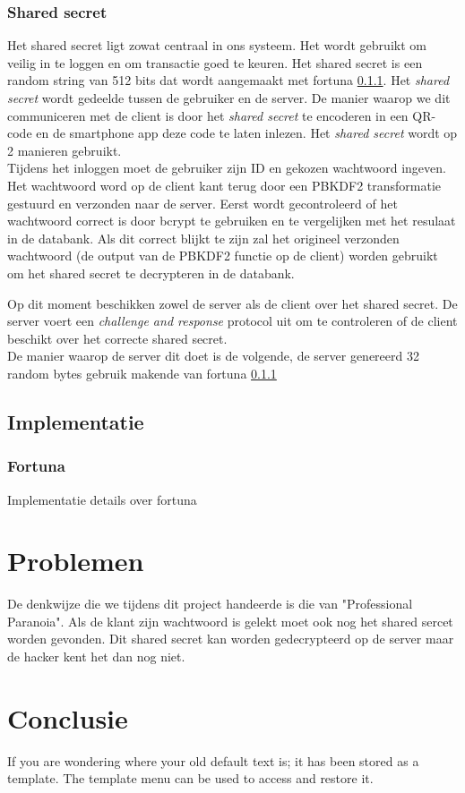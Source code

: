 \documentclass[11pt]{article}
\begin{document}
\subsubsection{Shared secret}
Het shared secret ligt zowat centraal in ons systeem. Het wordt gebruikt om veilig in te loggen en om transactie goed te keuren. Het shared secret is een random string van 512 bits dat wordt aangemaakt met fortuna \ref{sec:fortuna}. 
Het \emph{shared secret} wordt gedeelde tussen de gebruiker en de server. De manier waarop we dit communiceren met de client is door het \emph{shared secret} te encoderen in een QR-code en de smartphone app deze code te laten inlezen. %
Het \emph{shared secret} wordt op 2 manieren gebruikt. \\
Tijdens het inloggen moet de gebruiker zijn ID en gekozen wachtwoord ingeven. Het wachtwoord word op de client kant terug door een PBKDF2 transformatie gestuurd en verzonden naar de server. Eerst wordt gecontroleerd of het wachtwoord correct is door bcrypt te gebruiken en te vergelijken met het resulaat in de databank. Als dit correct blijkt te zijn zal het origineel verzonden wachtwoord (de output van de PBKDF2 functie op de client) worden gebruikt om het shared secret te decrypteren in de databank.

Op dit moment beschikken zowel de server als de client over het shared secret. De server voert een \emph{challenge and response} protocol uit om te controleren of de client beschikt over het correcte shared secret.\\

De manier waarop de server dit doet is de volgende, de server genereerd 32 random bytes gebruik makende van fortuna \ref{sec:fortuna}
\subsection{Implementatie}
\subsubsection{Fortuna}
\label{sec:fortuna}
Implementatie details over fortuna
\section{Problemen}
De denkwijze die we tijdens dit project handeerde is die van "Professional Paranoia".
Als de klant zijn wachtwoord is gelekt moet ook nog het shared sercet worden gevonden. Dit shared secret kan worden gedecrypteerd op de server maar de hacker kent het dan nog niet.
\section{Conclusie}
If you are wondering where your old default text is; it has been stored as a template. The template menu can be used to access and restore it. 

{}

\end{document}
